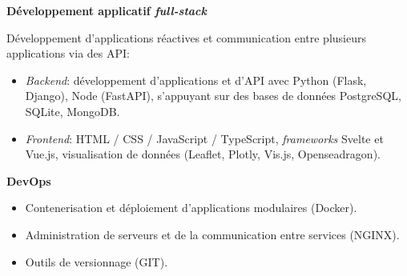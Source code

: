 \datedsubsection{ }
{}
{%
	\textbf{Développement applicatif \textit{full-stack}}}
{%
	Développement d'applications réactives et communication entre plusieurs applications via des API: 
	\begin{itemize}
		\item \textit{Backend}: développement d'applications et d'API avec Python (Flask, Django), Node (FastAPI), s'appuyant sur des bases de données PostgreSQL, SQLite, MongoDB.
		\item \textit{Frontend}: HTML / CSS / JavaScript / TypeScript, \textit{frameworks} Svelte et Vue.js, visualisation de données (Leaflet, Plotly, Vis.js, Openseadragon).
	\end{itemize}
}
\datedsubsection{ }
{}
{%
	\textbf{DevOps}}
{%
	\begin{itemize}
		\item Contenerisation et déploiement d'applications modulaires (Docker).
		\item Administration de serveurs et de la communication entre services (NGINX).
		\item Outils de versionnage (GIT).
	\end{itemize}%
}

